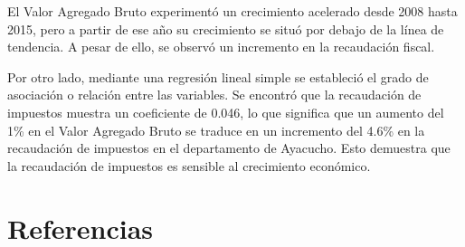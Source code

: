 \documentclass[
  letterpaper,
]{article}
\begin{document}
El Valor Agregado Bruto experimentó un crecimiento acelerado desde 2008
hasta 2015, pero a partir de ese año su crecimiento se situó por debajo
de la línea de tendencia. A pesar de ello, se observó un incremento en
la recaudación fiscal.

Por otro lado, mediante una regresión lineal simple se estableció el
grado de asociación o relación entre las variables. Se encontró que la
recaudación de impuestos muestra un coeficiente de 0.046, lo que
significa que un aumento del 1\% en el Valor Agregado Bruto se traduce
en un incremento del 4.6\% en la recaudación de impuestos en el
departamento de Ayacucho. Esto demuestra que la recaudación de impuestos
es sensible al crecimiento económico.

\hypertarget{referencias}{%
\section{Referencias}\label{referencias}}

\printbibliography[heading=none]
\end{document}
